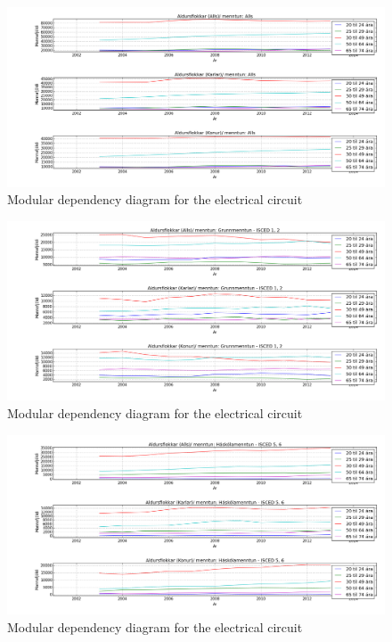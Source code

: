 \documentclass[12pt, svn, draft]{rureport}
\begin{document}
\begin{figure}
	\centering 
	\includegraphics[scale=0.7]{../graphics/mentun_aldrusflokkar_alls.png}
	\caption{Modular dependency diagram for the electrical circuit \label{fig:menntunall}}
\end{figure}

\begin{figure}
	\centering 
	\includegraphics[scale=0.7]{../graphics/mentun_aldrusflokkar_grunnmenntun.png}
	\caption{Modular dependency diagram for the electrical circuit \label{fig:menntungrunn}}
\end{figure}

\begin{figure}
	\centering 
	\includegraphics[scale=0.7]{../graphics/mentun_aldrusflokkar_haskolamenntun.png}
	\caption{Modular dependency diagram for the electrical circuit \label{fig:menntunhs}}
\end{figure}
%
\printbibliography
\end{document}
